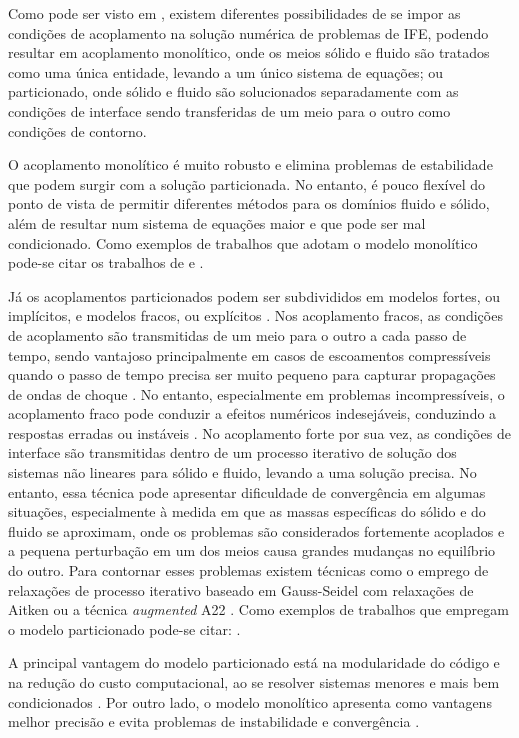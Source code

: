 Como pode ser visto em , existem diferentes possibilidades de se impor as condições de acoplamento na solução numérica de problemas de IFE, podendo resultar em acoplamento monolítico, onde os meios sólido e fluido são tratados como uma única entidade, levando a um único sistema de equações; ou particionado, onde sólido e fluido são solucionados separadamente com as condições de interface sendo transferidas de um meio para o outro como condições de contorno.

O acoplamento monolítico é muito robusto e elimina problemas de estabilidade que podem surgir com a solução particionada. No entanto, é pouco flexível do ponto de vista de permitir diferentes métodos para os domínios fluido e sólido, além de resultar num sistema de equações maior e que pode ser mal condicionado. Como exemplos de trabalhos que adotam o modelo monolítico pode-se citar os trabalhos de  e .

Já os acoplamentos particionados podem ser subdivididos em modelos fortes, ou implícitos, e modelos fracos, ou explícitos \cite{Felippaetal2001}. Nos acoplamento fracos, as condições de acoplamento são transmitidas de um meio para o outro a cada passo de tempo, sendo vantajoso principalmente em casos de escoamentos compressíveis quando o passo de tempo precisa ser muito pequeno para capturar propagações de ondas de choque \cite{sanches2011acoplamento,sanches2014fluid,sanches2013unconstrained}. No entanto, especialmente em problemas incompressíveis, o acoplamento fraco pode conduzir a efeitos numéricos indesejáveis, conduzindo a respostas erradas ou instáveis \cite{Felippaetal2001, fernandes2019ale}. No acoplamento forte por sua vez, as condições de interface são transmitidas dentro de um processo iterativo de solução dos sistemas não lineares para sólido e fluido, levando a uma solução precisa. No entanto, essa técnica pode apresentar dificuldade de convergência em algumas situações, especialmente à medida em que as massas específicas do sólido e do fluido se aproximam, onde os problemas são considerados fortemente acoplados e a pequena perturbação em um dos meios causa grandes mudanças no equilíbrio do outro. Para contornar esses problemas existem técnicas como o emprego de relaxações de processo iterativo baseado em Gauss-Seidel com relaxações de Aitken \cite{fernandes2019ale} ou a técnica \textit{augmented} A22 \cite{tezduyar2005finite}. Como exemplos de trabalhos que empregam o modelo particionado pode-se citar: .

A principal vantagem do modelo particionado está na modularidade do código e na redução do custo computacional, ao se resolver sistemas menores e mais bem condicionados \cite{sanches2011acoplamento,fernandes2020tecnica}. Por outro lado, o modelo monolítico apresenta como vantagens melhor precisão e evita problemas de instabilidade e convergência \cite{Avancini2023formulacao}.